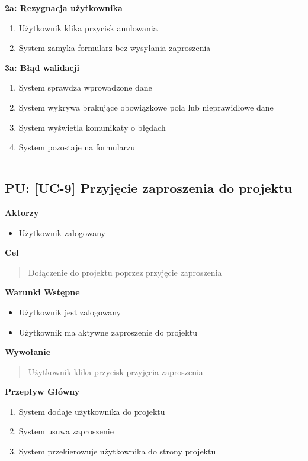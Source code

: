 \textbf{2a: Rezygnacja użytkownika}
\begin{enumerate}
    \item Użytkownik klika przycisk anulowania
    \item System zamyka formularz bez wysyłania zaproszenia
\end{enumerate}

\textbf{3a: Błąd walidacji}
\begin{enumerate}
    \item System sprawdza wprowadzone dane
    \item System wykrywa brakujące obowiązkowe pola lub nieprawidłowe dane
    \item System wyświetla komunikaty o błędach
    \item System pozostaje na formularzu
\end{enumerate}


\hrule
\vspace{1cm}

\subsection*{PU: [UC-9] Przyjęcie zaproszenia do projektu}

\noindent\textbf{Aktorzy}
\begin{itemize}
    \item Użytkownik zalogowany
\end{itemize}

\vspace{0.2cm}
\noindent\textbf{Cel}
\begin{quote}
    Dołączenie do projektu poprzez przyjęcie zaproszenia
\end{quote}

\vspace{0.2cm}
\noindent\textbf{Warunki Wstępne}
\begin{itemize}
    \item Użytkownik jest zalogowany
    \item Użytkownik ma aktywne zaproszenie do projektu
\end{itemize}

\vspace{0.2cm}
\noindent\textbf{Wywołanie}
\begin{quote}
    Użytkownik klika przycisk przyjęcia zaproszenia
\end{quote}

\vspace{0.2cm}
\noindent\textbf{Przepływ Główny}
\begin{enumerate}
    \item System dodaje użytkownika do projektu
    \item System usuwa zaproszenie
    \item System przekierowuje użytkownika do strony projektu
\end{enumerate}

